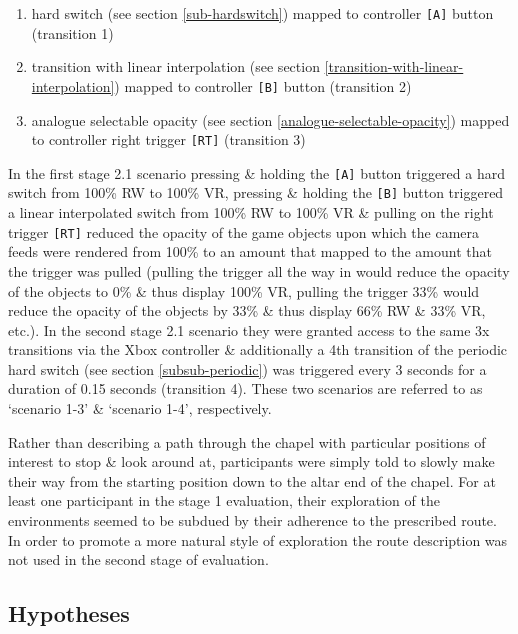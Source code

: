 \begin{enumerate}
	\item hard switch (see section \ref{sub-hardswitch}) mapped to controller \texttt{[A]} button (transition 1)
	\item transition with linear interpolation (see section \ref{transition-with-linear-interpolation}) mapped to controller \texttt{[B]} button (transition 2)
	\item analogue selectable opacity (see section \ref{analogue-selectable-opacity}) mapped to controller right trigger \texttt{[RT]} (transition 3)
\end{enumerate}

In the first stage 2.1 scenario pressing \& holding the \texttt{[A]} button triggered a hard switch from 100\% RW to 100\% VR, pressing \& holding the \texttt{[B]} button triggered a linear interpolated switch from 100\% RW to 100\% VR \& pulling on the right trigger \texttt{[RT]} reduced the opacity of the game objects upon which the camera feeds were rendered from 100\% to an amount that mapped to the amount that the trigger was pulled (pulling the trigger all the way in would reduce the opacity of the objects to 0\% \& thus display 100\% VR, pulling the trigger 33\% would reduce the opacity of the objects by 33\% \& thus display 66\% RW \& 33\% VR, etc.). In the second stage 2.1 scenario they were granted access to the same 3x transitions via the Xbox controller \& additionally a 4th transition of the periodic hard switch (see section \ref{subsub-periodic}) was triggered every 3 seconds for a duration of 0.15 seconds (transition 4). These two scenarios are referred to as `scenario 1-3' \& `scenario 1-4', respectively.

Rather than describing a path through the chapel with particular positions of interest to stop \& look around at, participants were simply told to slowly make their way from the starting position down to the altar end of the chapel. For at least one participant in the stage 1 evaluation, their exploration of the environments seemed to be subdued by their adherence to the prescribed route. In order to promote a more natural style of exploration the route description was not used in the second stage of evaluation.


\subsection{Hypotheses}

